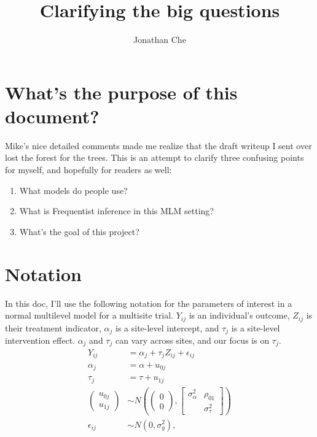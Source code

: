 \documentclass[]{article}
\title{Clarifying the big questions}
\author{Jonathan Che}
\begin{document}

\section*{What's the purpose of this document?}

Mike's nice detailed comments made me realize that the draft writeup I sent over lost the forest for the trees.
This is an attempt to clarify three confusing points for myself, and hopefully for readers as well:

\begin{enumerate}
	\item What models do people use?
	\item What is Frequentist inference in this MLM setting?
	\item What's the goal of this project?
\end{enumerate}

\section*{Notation}

In this doc, I'll use the following notation for the parameters of interest in a normal multilevel model for a multisite trial.
$Y_{ij}$ is an individual's outcome, $Z_{ij}$ is their treatment indicator, $\alpha_j$ is a site-level intercept, and $\tau_j$ is a site-level intervention effect.
$\alpha_j$ and $\tau_j$ can vary across sites, and our focus is on $\tau_j$.
\begin{align*}
	Y_{ij} &= \alpha_j + \tau_j Z_{ij} + \epsilon_{ij} \\
	\alpha_j &= \alpha + u_{0j} \\
	\tau_j &= \tau + u_{1j} \\
	\begin{pmatrix}
		u_{0j} \\ u_{1j}
	\end{pmatrix} &\sim N\left(
	\begin{pmatrix}
		0 \\ 0
	\end{pmatrix}, 
	\begin{bmatrix}
		\sigma^2_\alpha & \rho_{01} \\  & \sigma^2_\tau
	\end{bmatrix}\right) \\
	\epsilon_{ij} &\sim N(0, \sigma^2_y) ,
\end{align*}
\end{document}
